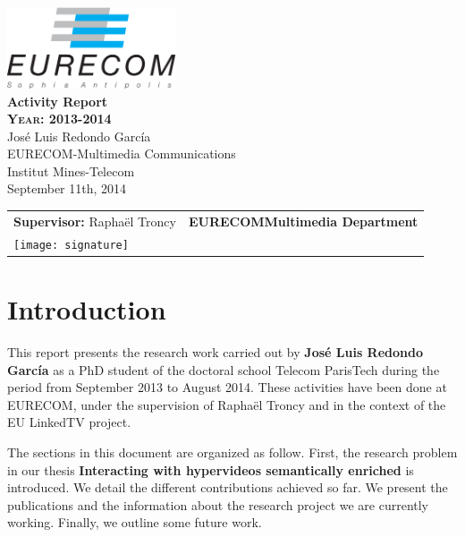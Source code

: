 \documentclass[a4paper,11pt]{report}
\begin{document}
\begin{titlepage}
\begin{center}
\includegraphics[width=5cm]{EURECOM_logo_quadri}
\\[3cm]
\textbf{\Huge{Activity Report}}
\\[2cm]
\textbf{\textsc{\LARGE{Year: 2013-2014}}}
\\[0.5cm]
\LARGE{Jos\'e Luis Redondo Garc\'ia}
\\[0.5cm]
\small{EURECOM-Multimedia Communications}
\\
\large{Institut Mines-Telecom}
\\
\large{September 11th, 2014}
\\[8cm]
\begin{tabular}{p{8cm} p{8.5cm}}
\small{\textbf{Supervisor:}
\newline
Rapha\"el Troncy} & \small{\textbf{EURECOM\newline Multimedia Department}} \\
\texttt{[image: signature]} &
\end{tabular}
\end{center}
\end{titlepage}


\chapter{Introduction}
This report presents the research work carried out by \textbf{Jos\'e Luis Redondo Garc\'ia} as a PhD student of the doctoral school Telecom ParisTech during the period from September 2013 to August 2014. These activities have been done at EURECOM, under the supervision of Rapha\"el Troncy and in the context of the EU LinkedTV project.

The sections in this document are organized as follow. First, the research problem in our thesis \textbf{Interacting with hypervideos semantically enriched} is introduced. We detail the different contributions achieved so far. We present the publications and the information about the research project we are currently working. Finally, we outline some future work.
\end{document}
